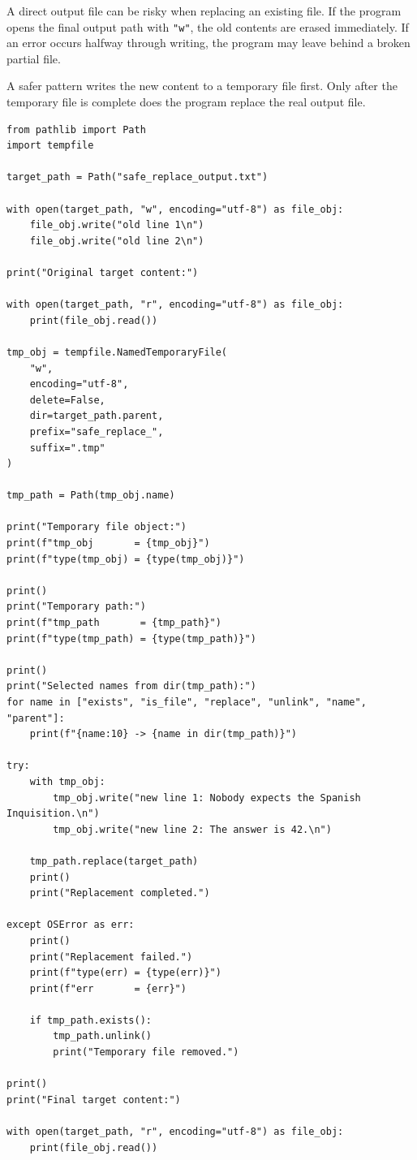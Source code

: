A direct output file can be risky when replacing an existing file. If the program opens the final output path with \texttt{"w"}, the old contents are erased immediately. If an error occurs halfway through writing, the program may leave behind a broken partial file.

A safer pattern writes the new content to a temporary file first. Only after the temporary file is complete does the program replace the real output file.

\begin{verbatim}
from pathlib import Path
import tempfile

target_path = Path("safe_replace_output.txt")

with open(target_path, "w", encoding="utf-8") as file_obj:
    file_obj.write("old line 1\n")
    file_obj.write("old line 2\n")

print("Original target content:")

with open(target_path, "r", encoding="utf-8") as file_obj:
    print(file_obj.read())

tmp_obj = tempfile.NamedTemporaryFile(
    "w",
    encoding="utf-8",
    delete=False,
    dir=target_path.parent,
    prefix="safe_replace_",
    suffix=".tmp"
)

tmp_path = Path(tmp_obj.name)

print("Temporary file object:")
print(f"tmp_obj       = {tmp_obj}")
print(f"type(tmp_obj) = {type(tmp_obj)}")

print()
print("Temporary path:")
print(f"tmp_path       = {tmp_path}")
print(f"type(tmp_path) = {type(tmp_path)}")

print()
print("Selected names from dir(tmp_path):")
for name in ["exists", "is_file", "replace", "unlink", "name", "parent"]:
    print(f"{name:10} -> {name in dir(tmp_path)}")

try:
    with tmp_obj:
        tmp_obj.write("new line 1: Nobody expects the Spanish Inquisition.\n")
        tmp_obj.write("new line 2: The answer is 42.\n")

    tmp_path.replace(target_path)
    print()
    print("Replacement completed.")

except OSError as err:
    print()
    print("Replacement failed.")
    print(f"type(err) = {type(err)}")
    print(f"err       = {err}")

    if tmp_path.exists():
        tmp_path.unlink()
        print("Temporary file removed.")

print()
print("Final target content:")

with open(target_path, "r", encoding="utf-8") as file_obj:
    print(file_obj.read())
\end{verbatim}

